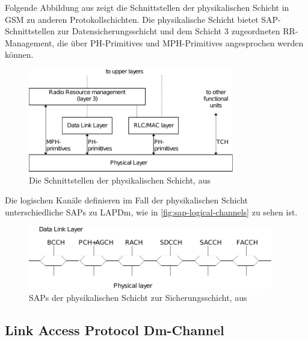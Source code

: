 Folgende Abbildung aus  zeigt die Schnittstellen der physikalischen Schicht in \ac{GSM} zu anderen Protokollschichten. Die physikalische Schicht bietet \ac{SAP}-Schnittstellen zur Datensicherungsschicht und dem Schicht 3 zugeordneten \ac{RR}-Management, die über PH-Primitives und MPH-Primitives angesprochen werden können.

\begin{figure}[H]
  \begin{center}
    \includegraphics[width=0.8\textwidth]{figures/0404_fig_21.pdf}
  \end{center}
  \caption[Die Schnittstellen der physikalischen Schicht]{Die Schnittstellen der physikalischen Schicht, aus } \label{fig:interface-physical-layer} 
\end{figure}

Die logischen Kanäle definieren im Fall der physikalischen Schicht unterschiedliche \acp{SAP} zu \ac{LAPDm}, wie in \autoref{fig:sap-logical-channels} zu sehen ist.

\begin{figure}[H]
  \begin{center}
    \includegraphics[width=0.95\textwidth]{figures/0404_fig_23.pdf}
  \end{center}
  \caption[SAPs der physikalischen Schicht zur Sicherungsschicht ]{\acp{SAP} der physikalischen Schicht zur Sicherungsschicht, aus } \label{fig:sap-logical-channels} 
\end{figure}


\subsection{Link Access Protocol Dm-Channel}
\label{hdl:einfuehrung-gsm_schnittstellen_protokolle-um_interface-layer2}

